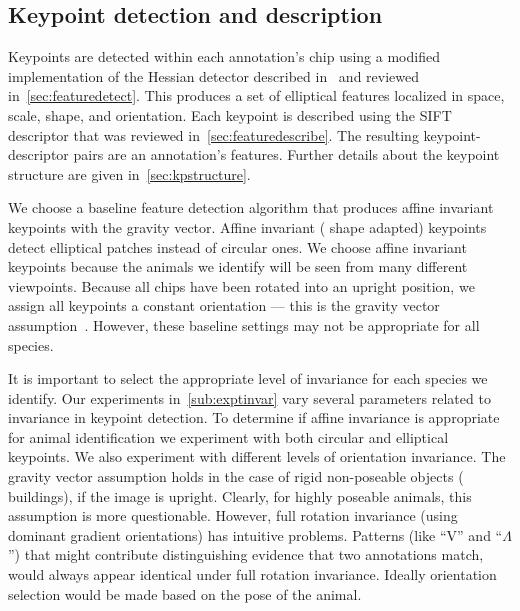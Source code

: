     \subsection{Keypoint detection and description}

        Keypoints are detected within each annotation's chip using a
          modified implementation of the Hessian detector described
          in~\cite{perdoch_efficient_2009} and reviewed
          in~\cref{sec:featuredetect}.
        This produces a set of elliptical features localized in space,
          scale, shape, and orientation.
        Each keypoint is described using the
          SIFT~\cite{lowe_distinctive_2004} descriptor that was reviewed
          in~\cref{sec:featuredescribe}.
        The resulting keypoint-descriptor pairs are an annotation's
          features.
        Further details about the keypoint structure are given
          in~\cref{sec:kpstructure}.

        We choose a baseline feature detection algorithm that produces
          affine invariant keypoints with the gravity vector.
        Affine invariant (\ie{} shape adapted) keypoints detect
          elliptical patches instead of circular ones.
        We choose affine invariant keypoints because the animals we
          identify will be seen from many different viewpoints.
        Because all chips have been rotated into an upright position,
          we assign all keypoints a constant orientation --- this is the
          gravity vector assumption~\cite{perdoch_efficient_2009}.
        However, these baseline settings may not be appropriate for all
          species.

        It is important to select the appropriate level of invariance
          for each species we identify.
        Our experiments in~\cref{sub:exptinvar} vary several parameters
          related to invariance in keypoint detection.
        To determine if affine invariance is appropriate for animal
          identification we experiment with both circular and elliptical
          keypoints.
        We also experiment with different levels of orientation
          invariance.
        The gravity vector assumption holds in the case of rigid
          non-poseable objects (\eg{} buildings), if the image is
          upright.
        Clearly, for highly poseable animals, this assumption is more
          questionable.
        However, full rotation invariance (using dominant gradient
          orientations) has intuitive problems.
        Patterns (like ``V'' and ``$\Lambda$'') that might contribute
          distinguishing evidence that two annotations match, would
          always appear identical under full rotation invariance.
        Ideally orientation selection would be made based on the pose
          of the animal.

